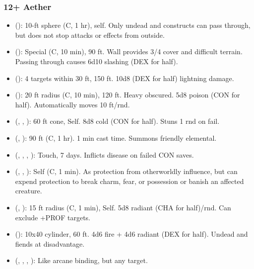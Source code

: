 \subsubsection{12+ Aether}
\begin{itemize}
	\item {} (): 10-ft sphere (C, 1 hr), self. Only undead and constructs can pass through, but does not stop attacks or effects from outside.
	\item {} (): Special (C, 10 min), 90 ft. Wall provides 3/4 cover and difficult terrain. Passing through causes 6d10 slashing (DEX for half).
	\item {} (): 4 targets within 30 ft, 150 ft. 10d8 (DEX for half) lightning damage. 
	\item {} (): 20 ft radius (C, 10 min), 120 ft. Heavy obscured. 5d8 poison (CON for half). Automatically moves 10 ft/rnd. 
	\item {} (, , ): 60 ft cone, Self. 8d8 cold (CON for half). Stuns 1 rnd on fail.
	\item {} (, ): 90 ft (C, 1 hr). 1 min cast time. Summons friendly elemental.
	\item {} (, , , ): Touch, 7 days. Inflicts disease on failed CON saves.
	\item {} (, , ): Self (C, 1 min). As protection from otherworldly influence, but can expend protection to break charm, fear, or possession or banish an affected creature.
	\item {} (, ): 15 ft radius (C, 1 min), Self. 5d8 radiant (CHA for half)/rnd. Can exclude +PROF targets.
	\item {} (): 10x40 cylinder, 60 ft. 4d6 fire + 4d6 radiant (DEX for half). Undead and fiends at disadvantage.
	\item {} (, , , ): Like arcane binding, but any target.

\end{itemize}

